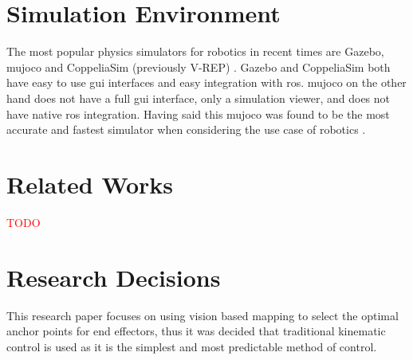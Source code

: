 



\section{Simulation Environment}

The most popular physics simulators for robotics in recent times are Gazebo, \ac{mujoco} and CoppeliaSim (previously V-REP) \citep{Collins-2021}. Gazebo and CoppeliaSim both have easy to use \ac{gui} interfaces and easy integration with \ac{ros}. \ac{mujoco} on the other hand does not have a full \ac{gui} interface, only a simulation viewer, and does not have native \ac{ros} integration. Having said this \ac{mujoco} was found to be the most accurate and fastest simulator when considering the use case of robotics \citep{Erez-2015}.

\section{Related Works}
\textcolor{red}{TODO}

\section{Research Decisions}
This research paper focuses on using vision based mapping to select the optimal anchor points for end effectors, thus it was decided that traditional kinematic control is used as it is the simplest and most predictable method of control.

